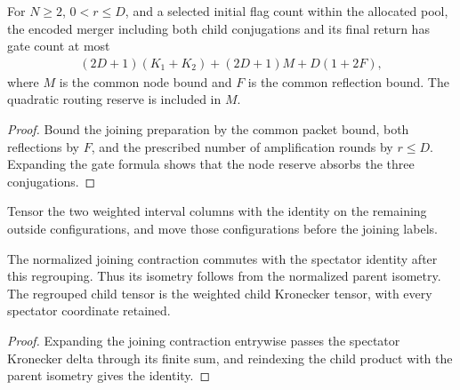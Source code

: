 \begin{lemma}
    \label{thm:mpu_actual_merger_resources}
    \leanok
    For $N\geq2$, $0<r\leq D$, and a selected initial flag count within the allocated
    pool, the encoded merger including both child conjugations and its final return
    has gate count at most
    \begin{align}
        (2D+1)(K_1+K_2)+(2D+1)M+D(1+2F),
    \end{align}
    where $M$ is the common node bound and $F$ is the common reflection bound.
    The quadratic routing reserve is included in $M$.
\end{lemma}
\begin{proof}\leanok
    Bound the joining preparation by the common packet bound, both reflections
    by $F$, and the prescribed number of amplification rounds by $r\leq D$.
    Expanding the gate formula shows that the node reserve absorbs the three conjugations.
\end{proof}

\begin{definition}
    \label{def:mpu_joining_spectators}
    \leanok
    Tensor the two weighted interval columns with the identity on the remaining
    outside configurations, and move those configurations before the joining labels.
\end{definition}

\begin{lemma}
    \label{thm:mpu_joining_spectators}
    \leanok
    The normalized joining contraction commutes with the spectator identity after
    this regrouping. Thus its isometry follows from the normalized parent
    isometry. The regrouped child tensor is the weighted child
    Kronecker tensor, with every spectator coordinate retained.
\end{lemma}
\begin{proof}\leanok
    Expanding the joining contraction entrywise passes the spectator Kronecker delta
    through its finite sum, and reindexing the child product with the
    parent isometry gives the identity.
\end{proof}

